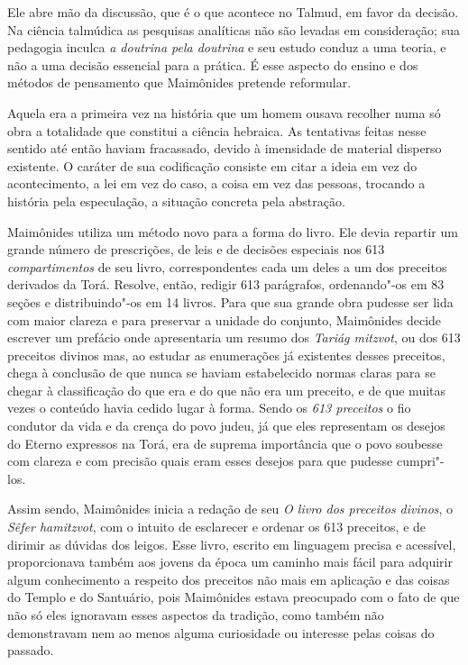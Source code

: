 Ele abre mão da discussão, que é o que acontece no Talmud, em
favor da decisão. Na ciência talmúdica as pesquisas analíticas não são
levadas em consideração; sua pedagogia inculca \emph{a doutrina pela
doutrina} e seu estudo conduz a uma teoria, e não a uma decisão
essencial para a prática. É esse aspecto do ensino e dos métodos de
pensamento que Maimônides pretende reformular.

Aquela era a primeira vez na história que um homem ousava recolher numa
só obra a totalidade que constitui a ciência hebraica. As tentativas
feitas nesse sentido até então haviam fracassado, devido à imensidade de
material disperso existente. O caráter de sua codificação consiste em
citar a ideia em vez do acontecimento, a lei em vez do caso, a coisa em
vez das pessoas, trocando a história pela especulação, a situação
concreta pela abstração.

Maimônides utiliza um método novo para a forma do livro. Ele devia
repartir um grande número de prescrições, de leis e de decisões
especiais nos 613 \emph{compartimentos} de seu livro, correspondentes cada
um deles a um dos preceitos derivados da Torá. Resolve, então,
redigir 613 parágrafos, ordenando"-os em 83 seções e distribuindo"-os em
14 livros. Para que sua grande obra pudesse ser lida com maior clareza e
para preservar a unidade do conjunto, Maimônides decide escrever um
prefácio onde apresentaria um resumo dos \emph{Tariág mitzvot}, ou dos
613 preceitos divinos mas, ao estudar as enumerações já existentes
desses preceitos, chega à conclusão de que nunca se haviam estabelecido
normas claras para se chegar à classificação do que era e do que não era
um preceito, e de que muitas vezes o conteúdo havia cedido lugar à
forma. Sendo os \emph{613 preceitos} o fio condutor da vida e da crença do
povo judeu, já que eles representam os desejos do Eterno expressos na
Torá, era de suprema importância que o povo soubesse com
clareza e com precisão quais eram esses desejos para que pudesse
cumpri"-los.

Assim sendo, Maimônides inicia a redação de seu \emph{O livro dos
preceitos divinos}, o \emph{Sêfer hamitzvot}, com o intuito de esclarecer
e ordenar os 613 preceitos, e de dirimir as dúvidas dos leigos. Esse
livro, escrito em linguagem precisa e acessível, proporcionava também
aos jovens da época um caminho mais fácil para adquirir algum
conhecimento a respeito dos preceitos não mais em aplicação e das coisas
do Templo e do Santuário, pois Maimônides estava preocupado com o fato
de que não só eles ignoravam esses aspectos da tradição, como também
não demonstravam nem ao menos alguma curiosidade ou interesse pelas
coisas do passado.

